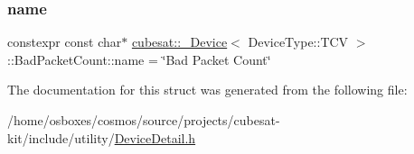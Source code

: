 \subsubsection{\texorpdfstring{name}{name}}
{\footnotesize\ttfamily constexpr const char$\ast$ \hyperlink{structcubesat_1_1__Device}{cubesat\+::\+\_\+\+Device}$<$ Device\+Type\+::\+T\+CV $>$\+::Bad\+Packet\+Count\+::name = \char`\"{}Bad Packet Count\char`\"{}\hspace{0.3cm}{\ttfamily [static]}}



The documentation for this struct was generated from the following file\+:\begin{DoxyCompactItemize}
\item 
/home/osboxes/cosmos/source/projects/cubesat-\/kit/include/utility/\hyperlink{DeviceDetail_8h}{Device\+Detail.\+h}\end{DoxyCompactItemize}
